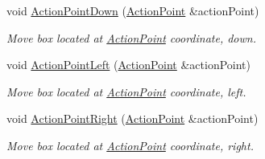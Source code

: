 \begin{DoxyCompactItemize}
void \hyperlink{classboxedin_1_1BoxedInNode_acb249031d913ed220380d94499cb8f86}{Action\+Point\+Down} (\hyperlink{structboxedin_1_1ActionPoint}{Action\+Point} \&action\+Point)
\begin{DoxyCompactList}\small\item\em Move box located at \hyperlink{structboxedin_1_1ActionPoint}{Action\+Point} coordinate, down. \end{DoxyCompactList}\item 
void \hyperlink{classboxedin_1_1BoxedInNode_addcc5fd3b61484c0f8911284c456cd9b}{Action\+Point\+Left} (\hyperlink{structboxedin_1_1ActionPoint}{Action\+Point} \&action\+Point)
\begin{DoxyCompactList}\small\item\em Move box located at \hyperlink{structboxedin_1_1ActionPoint}{Action\+Point} coordinate, left. \end{DoxyCompactList}\item 
void \hyperlink{classboxedin_1_1BoxedInNode_a6b3391ddf86653b300c1799eb81a84fe}{Action\+Point\+Right} (\hyperlink{structboxedin_1_1ActionPoint}{Action\+Point} \&action\+Point)
\begin{DoxyCompactList}\small\item\em Move box located at \hyperlink{structboxedin_1_1ActionPoint}{Action\+Point} coordinate, right. \end{DoxyCompactList}\end{DoxyCompactItemize}
